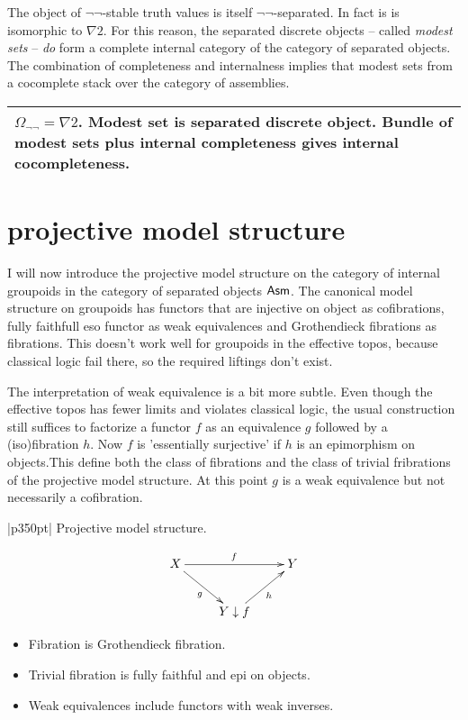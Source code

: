 \documentclass[12pt,a4paper]{article}
\theoremstyle{definition}
\newenvironment{blackboard}{\begin{tabular}{|p{350pt}|}\hline} {\\ \hline \end{tabular} }
\begin{document}
The object of $\neg\neg$-stable truth values is itself $\neg\neg$-separated. In fact is is isomorphic to $\nabla 2$. 
For this reason, the separated discrete objects -- called \emph{modest sets} -- \emph{do} form a complete internal category of the category of separated objects.
The combination of completeness and internalness implies that modest sets from a cocomplete stack over the category of assemblies.

\begin{blackboard} $\Omega_{\neg\neg} = \nabla 2$. Modest set is separated discrete object. Bundle of modest sets plus internal completeness gives internal cocompleteness. \end{blackboard}

\section{projective model structure}
I will now introduce the projective model structure on the category of internal groupoids in the category of separated objects $\mathsf{Asm}$.
The canonical model structure on groupoids has functors that are injective on object as cofibrations, fully faithfull eso functor as weak equivalences and Grothendieck fibrations as fibrations. This doesn't work well for groupoids in the effective topos, because classical logic fail there, so the required liftings don't exist.

The interpretation of weak equivalence is a bit more subtle. Even though the effective topos has fewer limits and violates classical logic, the usual construction still suffices to factorize a functor $f$ as an equivalence $g$ followed by a (iso)fibration $h$.
Now $f$ is 'essentially surjective' if $h$ is an epimorphism on objects.This define both the class of fibrations and the class of trivial fribrations of the projective model structure. At this point $g$ is a weak equivalence but not necessarily a cofibration.

\begin{blackboard}
Projective model structure.

\[ \xymatrix{
X\ar[rr]^f\ar[dr]_g && Y\\
& Y\downarrow f \ar[ur]_h
}\]

\begin{itemize}
\item Fibration is Grothendieck fibration.
\item Trivial fibration is fully faithful and epi on objects.
\item Weak equivalences include functors with weak inverses.
\end{itemize}
\end{blackboard}
\end{document}
